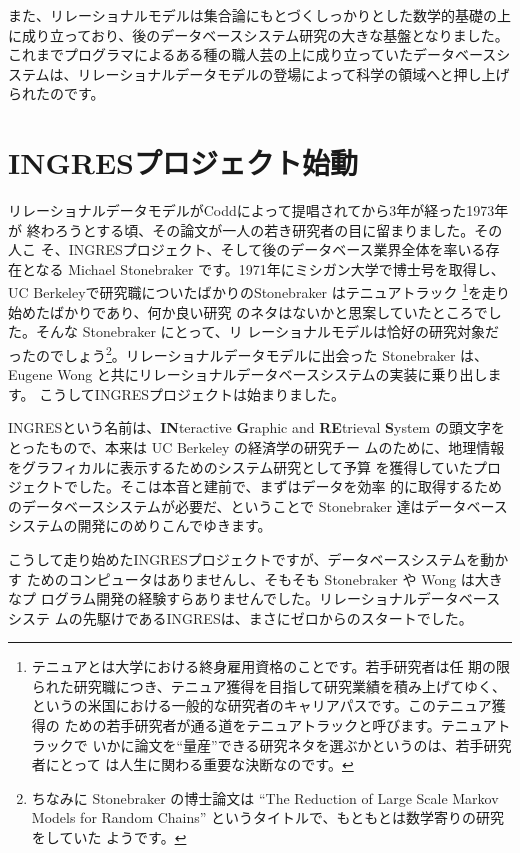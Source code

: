また、リレーショナルモデルは集合論にもとづくしっかりとした数学的基礎の上
に成り立っており、後のデータベースシステム研究の大きな基盤となりました。
これまでプログラマによるある種の職人芸の上に成り立っていたデータベースシ
ステムは、リレーショナルデータモデルの登場によって科学の領域へと押し上げ
られたのです。

\section{INGRESプロジェクト始動}

リレーショナルデータモデルがCoddによって提唱されてから3年が経った1973年が
終わろうとする頃、その論文が一人の若き研究者の目に留まりました。その人こ
そ、INGRESプロジェクト、そして後のデータベース業界全体を率いる存在となる
Michael Stonebraker です。1971年にミシガン大学で博士号を取得し、UC
Berkeleyで研究職についたばかりのStonebraker はテニュアトラック
\footnote{テニュアとは大学における終身雇用資格のことです。若手研究者は任
期の限られた研究職につき、テニュア獲得を目指して研究業績を積み上げてゆく、
というの米国における一般的な研究者のキャリアパスです。このテニュア獲得の
ための若手研究者が通る道をテニュアトラックと呼びます。テニュアトラックで
いかに論文を``量産''できる研究ネタを選ぶかというのは、若手研究者にとって
は人生に関わる重要な決断なのです。}を走り始めたばかりであり、何か良い研究
のネタはないかと思案していたところでした。そんな Stonebraker にとって、リ
レーショナルモデルは恰好の研究対象だったのでしょう\footnote{ちなみに
Stonebraker の博士論文は ``The Reduction of Large Scale Markov Models
for Random Chains'' というタイトルで、もともとは数学寄りの研究をしていた
ようです。 }。リレーショナルデータモデルに出会った Stonebraker は、
Eugene Wong と共にリレーショナルデータベースシステムの実装に乗り出します。
こうしてINGRESプロジェクトは始まりました。


INGRESという名前は、{\bf IN}teractive {\bf G}raphic and {\bf RE}trieval
{\bf S}ystem の頭文字をとったもので、本来は UC Berkeley の経済学の研究チー
ムのために、地理情報をグラフィカルに表示するためのシステム研究として予算
を獲得していたプロジェクトでした。そこは本音と建前で、まずはデータを効率
的に取得するためのデータベースシステムが必要だ、ということで Stonebraker
達はデータベースシステムの開発にのめりこんでゆきます。

こうして走り始めたINGRESプロジェクトですが、データベースシステムを動かす
ためのコンピュータはありませんし、そもそも Stonebraker や Wong は大きなプ
ログラム開発の経験すらありませんでした。リレーショナルデータベースシステ
ムの先駆けであるINGRESは、まさにゼロからのスタートでした。

